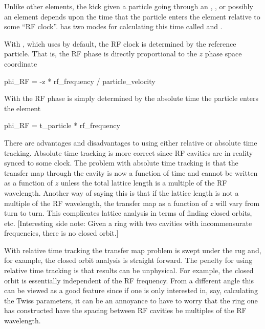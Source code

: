 Unlike other elements, the kick given a particle going through an
, , or possibly an  element
depends upon the time that the particle enters the element relative to
some ``RF clock''. \bmad has two modes for calculating this time
called  and .

With , which \bmad uses by default, the RF
clock is determined by the reference particle. That is, the RF phase
is directly proportional to the $z$ phase space coordinate
\begin{example}
  phi_RF = -z * rf_frequency / particle_velocity
\end{example}
With  the RF phase is simply determined by the 
absolute time the particle enters the element
\begin{example}
  phi_RF = t_particle * rf_frequency
\end{example}

There are advantages and disadvantages to using either relative or
absolute time tracking. Absolute time tracking is more correct
since RF cavities are in reality synced to some clock. The problem
with absolute time tracking is that the transfer map through the
cavity is now a function of time and cannot be written as a function
of $z$ unless the total lattice length is a multiple of the RF
wavelength.  Another way of saying this is that if the lattice length
is not a multiple of the RF wavelength, the transfer map as a function
of $z$ will vary from turn to turn. This complicates lattice analysis
in terms of finding closed orbits, etc. [Interesting side note: Given
a ring with two cavities with incommensurate frequencies, there is no
closed orbit.] 

With relative time tracking the transfer map problem is swept under
the rug and, for example, the closed orbit analysis is straight
forward. The penelty for using relative time tracking is that results
can be unphysical. For example, the closed orbit is essentially
independent of the RF frequency. From a different angle this can be
viewed as a good feature since if one is only interested in, say,
calculating the Twiss parameters, it can be an annoyance to have to
worry that the ring one has constructed have the spacing between RF
cavities be multiples of the RF wavelength.

